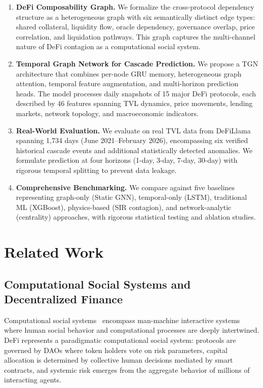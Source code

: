 \documentclass[journal]{IEEEtran}
\begin{document}
\begin{enumerate}
    \item \textbf{DeFi Composability Graph.} We formalize the cross-protocol dependency structure as a heterogeneous graph with six semantically distinct edge types: shared collateral, liquidity flow, oracle dependency, governance overlap, price correlation, and liquidation pathways. This graph captures the multi-channel nature of DeFi contagion as a computational social system.

    \item \textbf{Temporal Graph Network for Cascade Prediction.} We propose a TGN architecture that combines per-node GRU memory, heterogeneous graph attention, temporal feature augmentation, and multi-horizon prediction heads. The model processes daily snapshots of 15 major DeFi protocols, each described by 46 features spanning TVL dynamics, price movements, lending markets, network topology, and macroeconomic indicators.

    \item \textbf{Real-World Evaluation.} We evaluate on real TVL data from DeFiLlama spanning 1,734 days (June 2021--February 2026), encompassing six verified historical cascade events and additional statistically detected anomalies. We formulate prediction at four horizons (1-day, 3-day, 7-day, 30-day) with rigorous temporal splitting to prevent data leakage.

    \item \textbf{Comprehensive Benchmarking.} We compare against five baselines representing graph-only (Static GNN), temporal-only (LSTM), traditional ML (XGBoost), physics-based (SIR contagion), and network-analytic (centrality) approaches, with rigorous statistical testing and ablation studies.
\end{enumerate}

\section{Related Work}

\subsection{Computational Social Systems and Decentralized Finance}

Computational social systems~\cite{wang2020computational} encompass man-machine interactive systems where human social behavior and computational processes are deeply intertwined.
DeFi represents a paradigmatic computational social system: protocols are governed by DAOs where token holders vote on risk parameters, capital allocation is determined by collective human decisions mediated by smart contracts, and systemic risk emerges from the aggregate behavior of millions of interacting agents.
\end{document}
